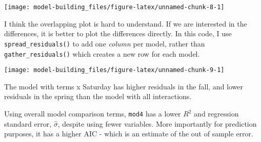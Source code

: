 \documentclass[]{book}
\newenvironment{Shaded}{\begin{snugshade}}{\end{snugshade}}
\newcommand{\CommentTok}[1]{\textcolor[rgb]{0.56,0.35,0.01}{\textit{#1}}}
\newcommand{\DataTypeTok}[1]{\textcolor[rgb]{0.13,0.29,0.53}{#1}}
\newcommand{\FloatTok}[1]{\textcolor[rgb]{0.00,0.00,0.81}{#1}}
\newcommand{\KeywordTok}[1]{\textcolor[rgb]{0.13,0.29,0.53}{\textbf{#1}}}
\newcommand{\NormalTok}[1]{#1}
\newcommand{\OperatorTok}[1]{\textcolor[rgb]{0.81,0.36,0.00}{\textbf{#1}}}
\newcommand{\StringTok}[1]{\textcolor[rgb]{0.31,0.60,0.02}{#1}}
\theoremstyle{plain}
\theoremstyle{remark}
\begin{document}
\begin{center}\texttt{[image: model-building\_files/figure-latex/unnamed-chunk-8-1]} \end{center}

I think the overlapping plot is hard to understand. If we are interested
in the differences, it is better to plot the differences directly. In
this code, I use \texttt{spread\_residuals()} to add one \emph{column}
per model, rather than \texttt{gather\_residuals()} which creates a new
row for each model.

\begin{Shaded}
\end{Shaded}

\begin{center}\texttt{[image: model-building\_files/figure-latex/unnamed-chunk-9-1]} \end{center}

The model with terms x Saturday has higher residuals in the fall, and
lower residuals in the spring than the model with all interactions.

Using overall model comparison terms, \texttt{mod4} has a lower \(R^2\)
and regression standard error, \(\hat\sigma\), despite using fewer
variables. More importantly for prediction purposes, it has a higher AIC
- which is an estimate of the out of sample error.

\begin{Shaded}
\end{Shaded}
\end{document}
